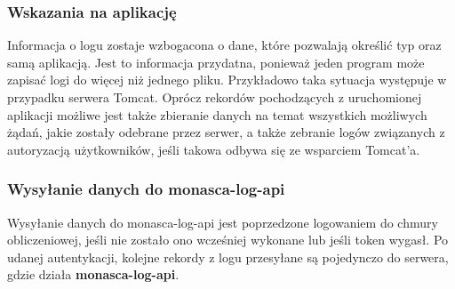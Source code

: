         \subsubsection{Wskazania na aplikację}
            Informacja o logu zostaje wzbogacona o dane, które pozwalają określić typ oraz samą aplikacją.
            Jest to informacja przydatna, ponieważ jeden program może zapisać logi do więcej niż jednego pliku.
            Przykładowo taka sytuacja występuje w przypadku serwera Tomcat. Oprócz rekordów pochodzących
            z uruchomionej aplikacji możliwe jest także zbieranie danych na temat wszystkich możliwych
            żądań, jakie zostały odebrane przez serwer, a także zebranie logów związanych z autoryzacją użytkowników, jeśli
            takowa odbywa się ze wsparciem Tomcat'a.
            
         \subsubsection{Wysyłanie danych do monasca-log-api}
             Wysyłanie danych do monasca-log-api jest poprzedzone logowaniem do chmury obliczeniowej, jeśli nie
             zostało ono wcześniej wykonane lub jeśli token wygasł. Po udanej autentykacji, kolejne rekordy
             z logu przesyłane są pojedynczo do serwera, gdzie działa \textbf{monasca-log-api}.